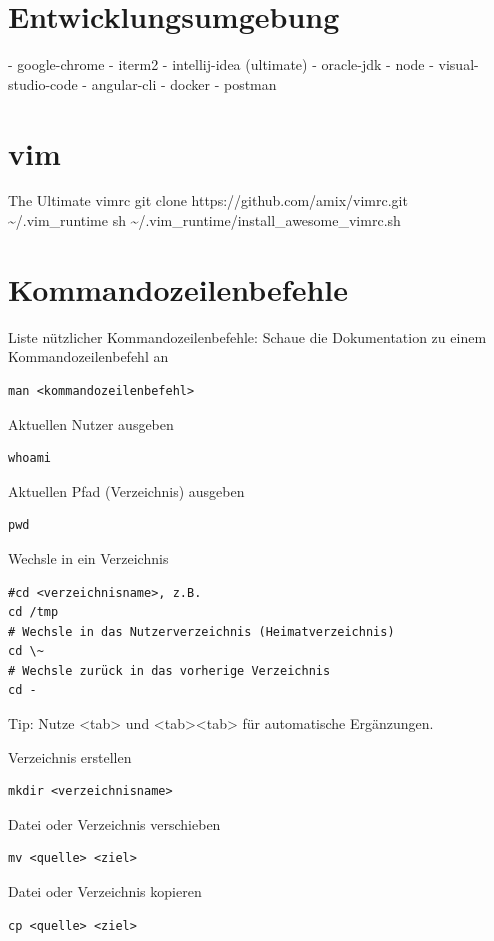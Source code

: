 \documentclass[]{article}
\begin{document}
\section{Entwicklungsumgebung}
    - google-chrome
- iterm2
- intellij-idea (ultimate)
- oracle-jdk
- node
- visual-studio-code
- angular-cli
- docker
- postman

\section{vim}
The Ultimate vimrc
git clone https://github.com/amix/vimrc.git \~{}/.vim\_runtime
sh \~{}/.vim\_runtime/install\_awesome\_vimrc.sh

\section{Kommandozeilenbefehle}
Liste nützlicher Kommandozeilenbefehle:
Schaue die Dokumentation zu einem Kommandozeilenbefehl an
\begin{verbatim}
man <kommandozeilenbefehl>
\end{verbatim}

Aktuellen Nutzer ausgeben
\begin{verbatim}
whoami
\end{verbatim}

Aktuellen Pfad (Verzeichnis) ausgeben
\begin{verbatim}
pwd
\end{verbatim}

Wechsle in ein Verzeichnis
\begin{verbatim}
#cd <verzeichnisname>, z.B.
cd /tmp
# Wechsle in das Nutzerverzeichnis (Heimatverzeichnis)
cd \~
# Wechsle zurück in das vorherige Verzeichnis
cd -
\end{verbatim}

Tip: Nutze <tab> und <tab><tab> für automatische Ergänzungen.

Verzeichnis erstellen
\begin{verbatim}
mkdir <verzeichnisname>
\end{verbatim}

Datei oder Verzeichnis verschieben
\begin{verbatim}
mv <quelle> <ziel>
\end{verbatim}

Datei oder Verzeichnis kopieren
\begin{verbatim}
cp <quelle> <ziel>
\end{verbatim}
\end{document}
